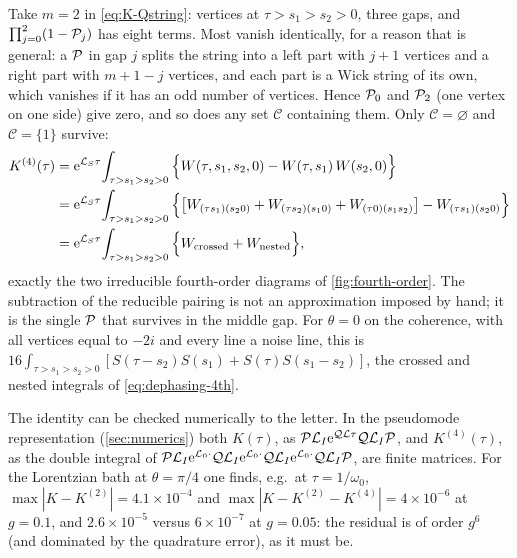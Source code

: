 \begin{exbox}
Take $m=2$ in \cref{eq:K-Qstring}: vertices at $\tau>s_1>s_2>0$, three gaps, and $\prod_{j=0}^{2}(1-\mathcal{P}_j)$ has eight terms.
Most vanish identically, for a reason that is general: a $\mathcal{P}$ in gap $j$ splits the string into a left part with $j+1$ vertices and a right part with $m+1-j$ vertices, and each part is a Wick string of its own, which vanishes if it has an odd number of vertices.
Hence $\mathcal{P}_0$ and $\mathcal{P}_2$ (one vertex on one side) give zero, and so does any set $\mathcal C$ containing them.
Only $\mathcal C=\varnothing$ and $\mathcal C=\{1\}$ survive:
\begin{align}
  K^{(4)}(\tau)&=\mathrm{e}^{\mathcal{L}_S\tau}\!\int_{\tau>s_1>s_2>0}\Big\{W(\tau,s_1,s_2,0)-W(\tau,s_1)\,W(s_2,0)\Big\}\notag\\
  &=\mathrm{e}^{\mathcal{L}_S\tau}\!\int_{\tau>s_1>s_2>0}\Big\{\big[W_{(\tau s_1)(s_20)}+W_{(\tau s_2)(s_10)}+W_{(\tau0)(s_1s_2)}\big]-W_{(\tau s_1)(s_20)}\Big\}\notag\\
  &=\mathrm{e}^{\mathcal{L}_S\tau}\!\int_{\tau>s_1>s_2>0}\Big\{W_{\text{crossed}}+W_{\text{nested}}\Big\},
\end{align}
exactly the two irreducible fourth-order diagrams of \cref{fig:fourth-order}.
The subtraction of the reducible pairing is not an approximation imposed by hand; it is the single $\mathcal{P}$ that survives in the middle gap.
For $\theta=0$ on the coherence, with all vertices equal to $-2i$ and every line a noise line, this is $16\int_{\tau>s_1>s_2>0}[S(\tau-s_2)S(s_1)+S(\tau)S(s_1-s_2)]$, the crossed and nested integrals of \cref{eq:dephasing-4th}.

The identity can be checked numerically to the letter.
In the pseudomode representation (\cref{sec:numerics}) both $K(\tau)$, as $\mathcal{P}\mathcal{L}_I\mathrm{e}^{\mathcal{Q}\mathcal{L}\tau}\mathcal{Q}\mathcal{L}_I\mathcal{P}$, and $K^{(4)}(\tau)$, as the double integral of $\mathcal{P}\mathcal{L}_I\mathrm{e}^{\mathcal{L}_0\cdot}\mathcal{Q}\mathcal{L}_I\mathrm{e}^{\mathcal{L}_0\cdot}\mathcal{Q}\mathcal{L}_I\mathrm{e}^{\mathcal{L}_0\cdot}\mathcal{Q}\mathcal{L}_I\mathcal{P}$, are finite matrices.
For the Lorentzian bath at $\theta=\pi/4$ one finds, e.g.\ at $\tau=1/\omega_0$, $\max|K-K^{(2)}|=4.1\times10^{-4}$ and $\max|K-K^{(2)}-K^{(4)}|=4\times10^{-6}$ at $g=0.1$, and $2.6\times10^{-5}$ versus $6\times10^{-7}$ at $g=0.05$: the residual is of order $g^6$ (and dominated by the quadrature error), as it must be.
\end{exbox}

